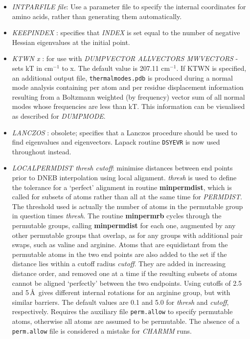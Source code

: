 \documentclass[12pt,a4paper,dvips]{article}
\begin{document}
\begin{itemize}
\item {\it INTPARFILE file\/}: Use a parameter file to specify the internal
  coordinates for amino acids, rather than generating them automatically. 

\item {\it KEEPINDEX \/}: specifies that {\it INDEX\/} is set equal to
      the number of negative Hessian eigenvalues at the initial point.

\item {\it KTWN x \/}: for use with {\it DUMPVECTOR ALLVECTORS MWVECTORS} - sets kT in cm$^{-1}$ to x. The default value is 207.11 cm$^{-1}$. If KTWN is specified, an additional output file, {\tt thermalmodes.pdb} is produced during a normal mode analysis containing per atom and per residue displacement information resulting from a Boltzmann weighted (by frequency) vector sum of all normal modes whose frequencies are less than kT. This information can be visualised as described for {\it DUMPMODE}.

\item {\it LANCZOS \/}: obsolete; specifies that a Lanczos procedure should be used to
find eigenvalues and eigenvectors. 
Lapack routine {\tt DSYEVR} is now used throughout instead.


\item {\it LOCALPERMDIST thresh cutoff\/}: minimise distances between end points
prior to DNEB interpolation using local alignment.
{\it thresh} is used to define the tolerance for a `perfect' alignment
in routine {\bf minpermdist}, which is called for subsets of atoms
rather than all at the same time for {\it PERMDIST}.
The threshold used is actually the number of atoms in the permutable
group in question times {\it thresh\/}.
The routine {\bf minpermrb} cycles through the permutable groups,
calling {\bf minpermdist} for each one, augmented by any other permutable
groups that overlap, as for any groups with additional pair swaps, such
as valine and arginine.
Atoms that are equidistant from the permutable atoms in the two end points
are also added to the set if the distance lies within a cutoff
radius {\it cutoff\/}.
They are added in increasing distance order, and removed one at a time 
if the resulting subsets of atoms cannot be aligned `perfectly' between
the two endpoints.
Using cutoffs of 2.5 and 5\,\AA\ gives different internal rotations for
an arginine group, but with similar barriers. 
The default values are 0.1 and 5.0 for {\it thresh} and {\it cutoff\/},
respectively.
Requires the auxiliary file {\tt perm.allow} to specify permutable atoms, otherwise
all atoms are assumed to be permutable. The absence of a {\tt perm.allow}
file is considered a mistake for {\it CHARMM\/} runs.


\end{itemize}
\end{document}
